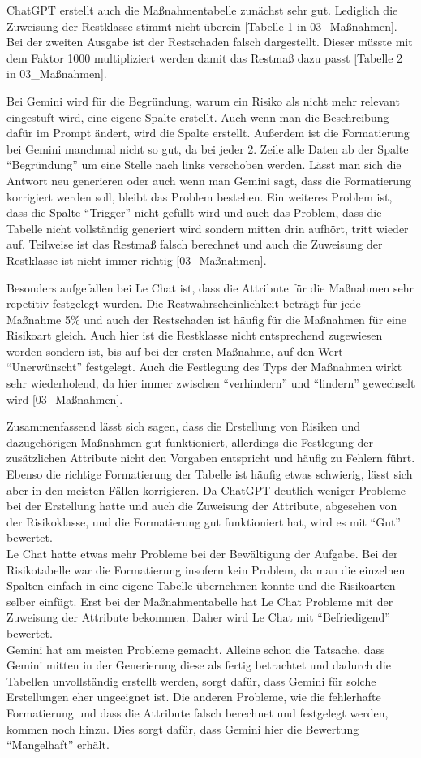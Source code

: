 ChatGPT erstellt auch die Maßnahmentabelle zunächst sehr gut. Lediglich die Zuweisung der Restklasse stimmt nicht überein 
[Tabelle 1 in 03\_Maßnahmen]. Bei der zweiten Ausgabe ist der Restschaden falsch dargestellt. Dieser müsste mit dem Faktor 
1000 multipliziert werden damit das Restmaß dazu passt [Tabelle 2 in 03\_Maßnahmen].

Bei Gemini wird für die Begründung, warum ein Risiko als nicht mehr relevant eingestuft wird, eine eigene Spalte erstellt.
Auch wenn man die Beschreibung dafür im Prompt ändert, wird die Spalte erstellt. Außerdem ist die Formatierung bei Gemini
manchmal nicht so gut, da bei jeder 2. Zeile alle Daten ab der Spalte ``Begründung'' um eine Stelle nach links verschoben werden.
Lässt man sich die Antwort neu generieren oder auch wenn man Gemini sagt, dass die Formatierung korrigiert werden soll, bleibt das 
Problem bestehen. Ein weiteres Problem ist, dass die Spalte ``Trigger'' nicht gefüllt wird und auch das Problem, dass
die Tabelle nicht vollständig generiert wird sondern mitten drin aufhört, tritt wieder auf. Teilweise ist das Restmaß 
falsch berechnet und auch die Zuweisung der Restklasse ist nicht immer richtig [03\_Maßnahmen].

Besonders aufgefallen bei Le Chat ist, dass die Attribute für die Maßnahmen sehr repetitiv festgelegt wurden. Die Restwahrscheinlichkeit
beträgt für jede Maßnahme 5\% und auch der Restschaden ist häufig für die Maßnahmen für eine Risikoart gleich. Auch hier ist die 
Restklasse nicht entsprechend zugewiesen worden sondern ist, bis auf bei der ersten Maßnahme, auf den Wert ``Unerwünscht'' festgelegt. Auch 
die Festlegung des Typs der Maßnahmen wirkt sehr wiederholend, da hier immer zwischen ``verhindern'' und ``lindern'' gewechselt wird [03\_Maßnahmen].

Zusammenfassend lässt sich sagen, dass die Erstellung von Risiken und dazugehörigen Maßnahmen gut funktioniert, allerdings 
die Festlegung der zusätzlichen Attribute nicht den Vorgaben entspricht und häufig zu Fehlern führt. Ebenso die richtige 
Formatierung der Tabelle ist häufig etwas schwierig, lässt sich aber in den meisten Fällen korrigieren. Da ChatGPT deutlich 
weniger Probleme bei der Erstellung hatte und auch die Zuweisung der Attribute, abgesehen von der Risikoklasse, und die 
Formatierung gut funktioniert hat, wird es mit ``Gut'' bewertet.\\
Le Chat hatte etwas mehr Probleme bei der Bewältigung der Aufgabe. Bei der Risikotabelle war die Formatierung insofern kein Problem, da man die 
einzelnen Spalten einfach in eine eigene Tabelle übernehmen konnte und die Risikoarten selber einfügt. Erst 
bei der Maßnahmentabelle hat Le Chat Probleme mit der Zuweisung der Attribute bekommen. Daher wird Le Chat mit 
``Befriedigend'' bewertet.\\
Gemini hat am meisten Probleme gemacht. Alleine schon die Tatsache, dass Gemini mitten in der Generierung diese als 
fertig betrachtet und dadurch die Tabellen unvollständig erstellt werden, sorgt dafür, dass Gemini für solche Erstellungen 
eher ungeeignet ist. Die anderen Probleme, wie die fehlerhafte Formatierung und dass die Attribute falsch berechnet und 
festgelegt werden, kommen noch hinzu. Dies sorgt dafür, dass Gemini hier die Bewertung ``Mangelhaft'' erhält.

